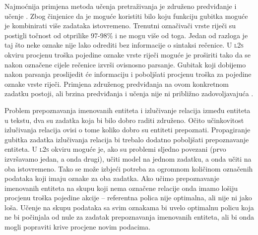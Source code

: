 Najmoćnija primjena metoda učenja pretraživanja je združeno predviđanje i učenje
. Zbog činjenice da je moguće koristiti bilo
koju funkciju gubitka moguće je kombinirati više zadataka istovremeno. Trenutni
označivači vrste riječi su postigli točnost od otprilike 97-98\%
\citep{manning2011part} i ne mogu više od toga. Jedan od razloga je taj što neke
oznake nije lako odrediti bez informacije o sintaksi rečenice. U \textsc{l2s}
okviru procjenu troška pojedine oznake vrste riječi moguće je proširiti tako da
se nakon označene cijele rečenice izvrši ovisnosno parsanje. Gubitak koji
dobijemo nakon parsanja proslijedit će informaciju i poboljšati procjenu troška
za pojedine oznake vrste riječi. Primjena združenog predviđanja na ovom
konkretnom zadatku postoji, ali brzina predviđanja i učenja nije ni približno
zadovoljavajuća \citep{bohnet2012transition}.

Problem prepoznavanja imenovanih entiteta i izlučivanje relacija između entiteta
u tekstu, dva su zadatka koja bi bilo dobro raditi združeno. Očito učinkovitost
izlučivanja relacija ovisi o tome koliko dobro su entiteti prepoznati.
Propagiranje gubitka zadatka izlučivanja relacija bi trebalo dodatno poboljšati
prepoznavanje entiteta. U \textsc{l2s} okviru moguće je, ako su problemi sljedno
povezani (prvo izvršavamo jedan, a onda drugi), učiti model na jednom zadatku, a
onda učiti na oba istovremeno. Tako se može izbjeći potreba za ogromnom
količinom označenih podataka koji imaju oznake za oba zadatka. Ako učimo
prepoznavanje imenovanih entiteta na skupu koji nema označene relacije onda
imamo lošiju procjenu troška pojedine akcije -- referentna polica nije
optimalna, ali nije ni jako loša. Učenje na skupu podataka sa svim oznakama bi
uvelo optimalnu policu koja ne bi počinjala od nule za zadatak prepoznavanja
imenovanih entiteta, ali bi onda mogli popraviti krive procjene novim podacima.

